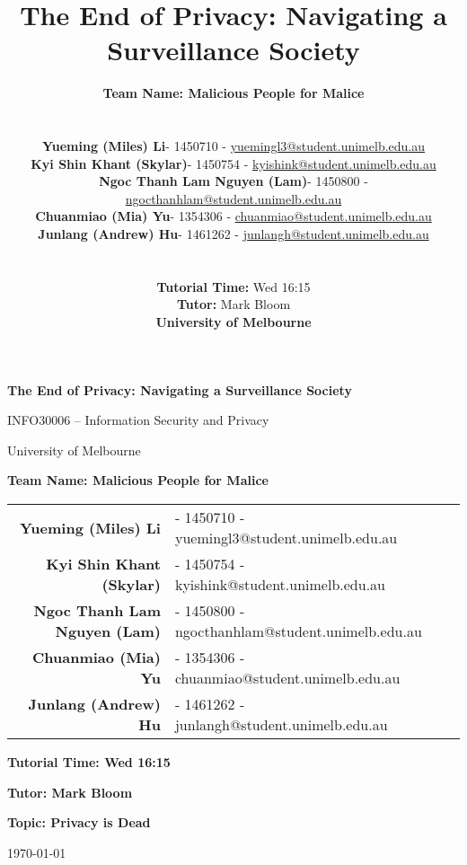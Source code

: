 \documentclass[a4paper,12pt]{article}
\title{The End of Privacy: Navigating a Surveillance Society}
\author{
  \textbf{Team Name: Malicious People for Malice} \\
  \\
  \begin{tabular}{ll}
    \textbf{Yueming (Miles) Li} & - 1450710 - \href{mailto:yuemingl3@student.unimelb.edu.au}{yuemingl3@student.unimelb.edu.au} \\
    \textbf{Kyi Shin Khant (Skylar)} & - 1450754 - \href{mailto:kyishink@student.unimelb.edu.au}{kyishink@student.unimelb.edu.au} \\
    \textbf{Ngoc Thanh Lam Nguyen (Lam)} & - 1450800 - \href{mailto:ngocthanhlam@student.unimelb.edu.au}{ngocthanhlam@student.unimelb.edu.au} \\
    \textbf{Chuanmiao (Mia) Yu} & - 1354306 - \href{mailto:chuanmiao@student.unimelb.edu.au}{chuanmiao@student.unimelb.edu.au} \\
    \textbf{Junlang (Andrew) Hu} & - 1461262 - \href{mailto:junlangh@student.unimelb.edu.au}{junlangh@student.unimelb.edu.au} \\
  \end{tabular}
  \\
  \\
  \textbf{Tutorial Time:} Wed 16:15 \\
  \textbf{Tutor:} Mark Bloom \\
  \textbf{University of Melbourne}
}
\date{} %
\begin{document}
\begin{titlepage}
  \centering
  {\Huge \bfseries The End of Privacy: Navigating a Surveillance Society\par}
  \vspace{1.5cm}
  {\Large INFO30006 – Information Security and Privacy\par}
  \vspace{0.5cm}
  {\Large University of Melbourne\par}
  \vspace{2cm}

  \textbf{Team Name: Malicious People for Malice} \par
  \vspace{1cm}

  \begin{tabular}{rl}
    \textbf{Yueming (Miles) Li} & - 1450710 - yuemingl3@student.unimelb.edu.au \\
    \textbf{Kyi Shin Khant (Skylar)} & - 1450754 - kyishink@student.unimelb.edu.au \\
    \textbf{Ngoc Thanh Lam Nguyen (Lam)} & - 1450800 - ngocthanhlam@student.unimelb.edu.au \\
    \textbf{Chuanmiao (Mia) Yu} & - 1354306 - chuanmiao@student.unimelb.edu.au \\
    \textbf{Junlang (Andrew) Hu} & - 1461262 - junlangh@student.unimelb.edu.au \\
  \end{tabular}

  \vspace{1.5cm}

  \textbf{Tutorial Time: Wed 16:15} \par
  \textbf{Tutor: Mark Bloom} \par
  \textbf{Topic: Privacy is Dead} \par
  \vfill
  {\Large \today\par}
\end{titlepage}

\onehalfspacing

\setlength{\parindent}{2em}
\end{document}
